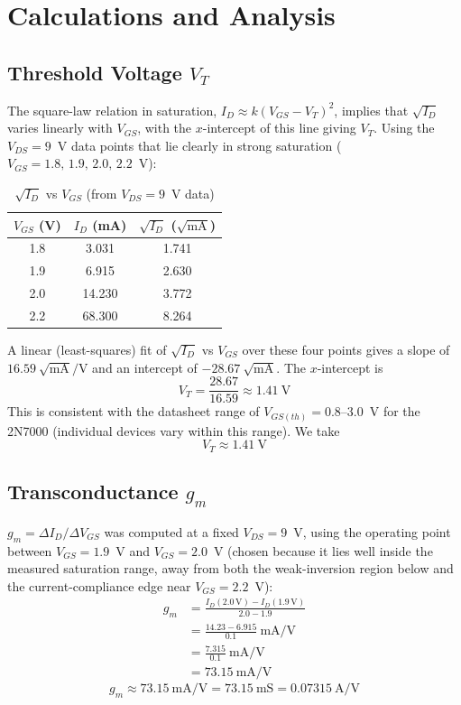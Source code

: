 \documentclass[12pt,a4paper]{article}
\begin{document}
\section{Calculations and Analysis}

\subsection{Threshold Voltage $V_T$}
The square-law relation in saturation, $I_D \approx k(V_{GS}-V_T)^2$, implies that $\sqrt{I_D}$ varies linearly with $V_{GS}$, with the $x$-intercept of this line giving $V_T$. Using the $V_{DS}=9$~V data points that lie clearly in strong saturation ($V_{GS}=1.8,\,1.9,\,2.0,\,2.2$~V):

\begin{table}[H]
\centering
\caption{$\sqrt{I_D}$ vs $V_{GS}$ (from $V_{DS}=9$~V data)}
\begin{tabular}{@{}ccc@{}}
\toprule
$V_{GS}$ (V) & $I_D$ (mA) & $\sqrt{I_D}$ ($\sqrt{\text{mA}}$) \\
\midrule
1.8 & 3.031  & 1.741 \\
1.9 & 6.915  & 2.630 \\
2.0 & 14.230 & 3.772 \\
2.2 & 68.300 & 8.264 \\
\bottomrule
\end{tabular}
\end{table}

A linear (least-squares) fit of $\sqrt{I_D}$ vs $V_{GS}$ over these four points gives a slope of $16.59~\sqrt{\text{mA}}/\text{V}$ and an intercept of $-28.67~\sqrt{\text{mA}}$. The $x$-intercept is
\begin{equation}
    V_T = \frac{28.67}{16.59} \approx 1.41~\text{V}
\end{equation}
This is consistent with the datasheet range of $V_{GS(th)} = 0.8$--$3.0$~V for the 2N7000 (individual devices vary within this range). We take
\begin{equation}
    \boxed{V_T \approx 1.41~\text{V}}
\end{equation}

\subsection{Transconductance $g_m$}
$g_m = \Delta I_D / \Delta V_{GS}$ was computed at a fixed $V_{DS}=9$~V, using the operating point between $V_{GS}=1.9$~V and $V_{GS}=2.0$~V (chosen because it lies well inside the measured saturation range, away from both the weak-inversion region below and the current-compliance edge near $V_{GS}=2.2$~V):
\begin{align}
    g_m &= \frac{I_D(2.0\,\text{V}) - I_D(1.9\,\text{V})}{2.0 - 1.9} \\
    &= \frac{14.23 - 6.915}{0.1}~\text{mA/V} \\
    &= \frac{7.315}{0.1}~\text{mA/V} \\
    &= 73.15~\text{mA/V}
\end{align}
\begin{equation}
    \boxed{g_m \approx 73.15~\text{mA/V} = 73.15~\text{mS} = 0.07315~\text{A/V}}
\end{equation}
\end{document}
